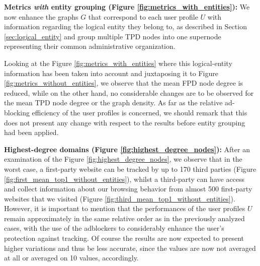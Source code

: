 \documentclass{sig-alternate}
\begin{document}
\textbf{Metrics \textit{with} entity grouping (Figure \ref{fig:metrics_with_entities}):} We now enhance the graphs $G$ that correspond to each user profile $U$ with information regarding the logical entity they belong to, as described in Section \ref{sec:logical_entity} and group multiple TPD nodes into one supernode representing their common administrative organization.

Looking at the Figure \ref{fig:metrics_with_entities} where this logical-entity information has been taken into account and juxtaposing it to Figure \ref{fig:metrics_without_entities}, we observe that the mean FPD node degree is reduced, while on the other hand, no considerable changes are to be observed for the mean TPD node degree or the graph density. As far as the relative ad-blocking efficiency of the user profiles is concerned, we should remark that this does not present any change with respect to the results before entity grouping had been applied.

\textbf{Highest-degree domains (Figure \ref{fig:highest_degree_nodes}):} After an examination of the Figure \ref{fig:highest_degree_nodes}, we observe that in the worst case, a first-party website can be tracked by up to 170 third parties (Figure \ref{fig:first_mean_top1_without_entities}), whilst a third-party can have access and collect information about our browsing behavior from almost 500 first-party websites that we visited (Figure \ref{fig:third_mean_top1_without_entities}). However, it is important to mention that the performances of the user profiles $U$ remain approximately in the same relative order as in the previously analyzed cases, with the use of the adblockers to considerably enhance the user's protection against tracking. Of course the results are now expected to present higher variations and thus be less accurate, since the values are now not averaged at all or averaged on 10 values, accordingly.
\end{document}
